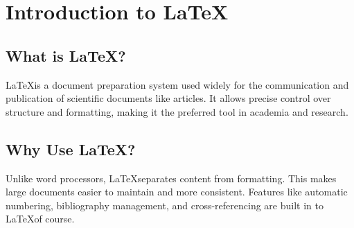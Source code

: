 \chapter{Introduction to \LaTeX}

\section{What is \LaTeX?}
\LaTeX is a document preparation system used widely for the communication and publication of scientific documents like articles. It allows precise control over structure and formatting, making it the preferred tool in academia and research.

\section{Why Use \LaTeX?}
Unlike word processors, \LaTeX separates content from formatting. This makes large documents easier to maintain and more consistent. Features like automatic numbering, bibliography management, and cross-referencing are built in to \LaTeX of course.


